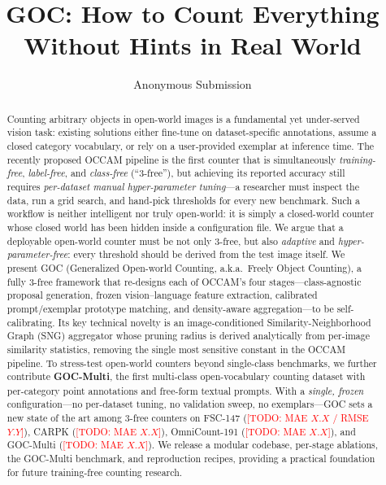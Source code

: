 \documentclass[letterpaper]{article}
\title{GOC: How to Count Everything Without Hints in Real World}
\author{
    Anonymous Submission\\
}
\newcommand{\todo}[1]{\textcolor{red}{[TODO: #1]}}
\begin{document}
\maketitle

\begin{abstract}
Counting arbitrary objects in open-world images is a fundamental yet under-served vision task: existing solutions either fine-tune on dataset-specific annotations, assume a closed category vocabulary, or rely on a user-provided exemplar at inference time. The recently proposed OCCAM pipeline is the first counter that is simultaneously \emph{training-free}, \emph{label-free}, and \emph{class-free} (``3-free''), but achieving its reported accuracy still requires \emph{per-dataset manual hyper-parameter tuning}---a researcher must inspect the data, run a grid search, and hand-pick thresholds for every new benchmark. Such a workflow is neither intelligent nor truly open-world: it is simply a closed-world counter whose closed world has been hidden inside a configuration file. We argue that a deployable open-world counter must be not only 3-free, but also \emph{adaptive} and \emph{hyper-parameter-free}: every threshold should be derived from the test image itself. We present GOC (Generalized Open-world Counting, a.k.a.\ Freely Object Counting), a fully 3-free framework that re-designs each of OCCAM's four stages---class-agnostic proposal generation, frozen vision--language feature extraction, calibrated prompt/exemplar prototype matching, and density-aware aggregation---to be self-calibrating. Its key technical novelty is an image-conditioned Similarity-Neighborhood Graph (SNG) aggregator whose pruning radius is derived analytically from per-image similarity statistics, removing the single most sensitive constant in the OCCAM pipeline. To stress-test open-world counters beyond single-class benchmarks, we further contribute \textbf{GOC-Multi}, the first multi-class open-vocabulary counting dataset with per-category point annotations and free-form textual prompts. With a \emph{single, frozen} configuration---no per-dataset tuning, no validation sweep, no exemplars---GOC sets a new state of the art among 3-free counters on FSC-147 (\todo{MAE $X.X$ / RMSE $Y.Y$}), CARPK (\todo{MAE $X.X$}), OmniCount-191 (\todo{MAE $X.X$}), and GOC-Multi (\todo{MAE $X.X$}). We release a modular codebase, per-stage ablations, the GOC-Multi benchmark, and reproduction recipes, providing a practical foundation for future training-free counting research.
\end{abstract}
\end{document}
